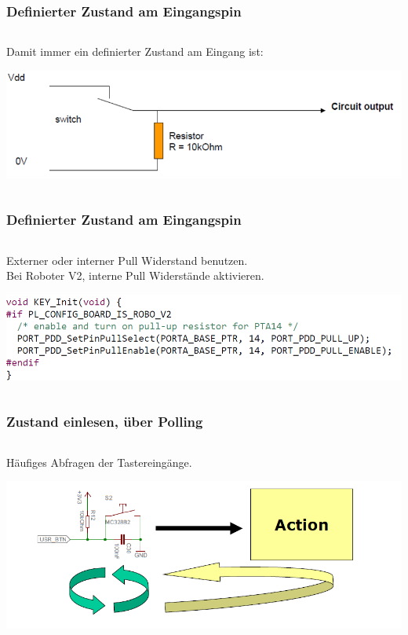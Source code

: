 
\begin{frame}
  \frametitle{Definierter Zustand am Eingangspin}
	    \begin{column}{1\linewidth}
	    	Damit immer ein definierter Zustand am Eingang ist:
	    	\begin{center}
	    		\includegraphics[width=1\textwidth]{images/Pullup.PNG}
	    	\end{center}
	    \end{column}
\end{frame}


\begin{frame}
	\frametitle{Definierter Zustand am Eingangspin}
	\begin{column}{1\linewidth}
		Externer oder interner Pull Widerstand benutzen.\\
		Bei Roboter V2, interne Pull Widerstände aktivieren.
		\begin{center}
			\includegraphics[width=1\textwidth]{images/ROBOV2.PNG}
		\end{center}
	\end{column}
\end{frame}

\begin{frame}
	\frametitle{Zustand einlesen, über Polling}
	\begin{column}{1\linewidth}
		Häufiges Abfragen der Tastereingänge.\\
		\begin{center}
			\includegraphics[width=1\textwidth]{images/Polling.PNG}
		\end{center}
	\end{column}
\end{frame}

